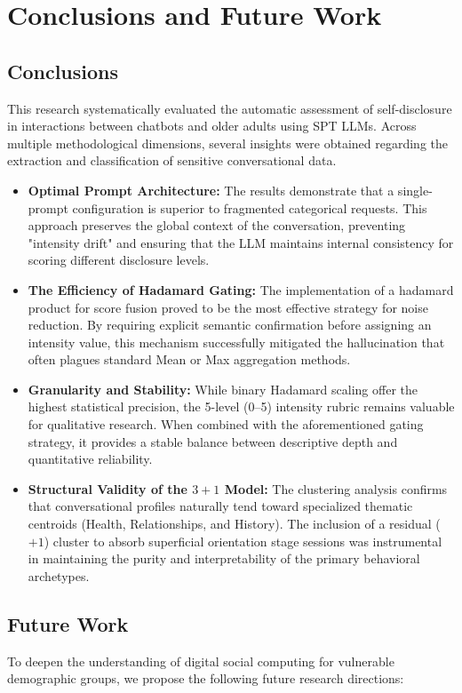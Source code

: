 \section{Conclusions and Future Work}

\subsection{Conclusions}
This research systematically evaluated the automatic assessment of self-disclosure in interactions between chatbots and older adults using SPT LLMs. Across multiple methodological dimensions, several insights were obtained regarding the extraction and classification of sensitive conversational data.

\begin{itemize}
    \item \textbf{Optimal Prompt Architecture:} The results demonstrate that a single-prompt configuration is superior to fragmented categorical requests. This approach preserves the global context of the conversation, preventing "intensity drift" and ensuring that the LLM maintains internal consistency  for scoring different disclosure levels.
    \item \textbf{The Efficiency of Hadamard Gating:} The implementation of a \gls{hadamard} product for score fusion proved to be the most effective strategy for noise reduction. By requiring explicit semantic confirmation before assigning an intensity value, this mechanism successfully mitigated the hallucination that often plagues standard Mean or Max aggregation methods.
    \item \textbf{Granularity and Stability:} While binary Hadamard scaling offer the highest statistical precision, the 5-level (0--5) intensity rubric remains valuable for qualitative research. When combined with the aforementioned gating strategy, it provides a stable balance between descriptive depth and quantitative reliability.
    \item \textbf{Structural Validity of the $3+1$ Model:} The clustering analysis confirms that conversational profiles naturally tend toward specialized thematic centroids (Health, Relationships, and History). The inclusion of a residual ($+1$) cluster to absorb superficial orientation stage sessions was instrumental in maintaining the purity and interpretability of the primary behavioral archetypes.
\end{itemize}

\newpage

\subsection{Future Work}
To deepen the understanding of digital social computing for vulnerable demographic groups, we propose the following future research directions:


